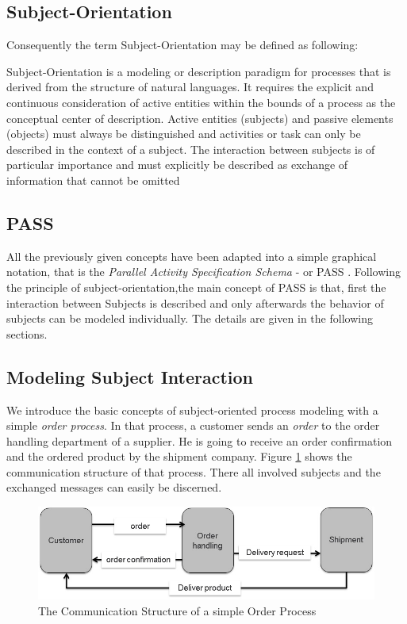 \subsection{Subject-Orientation}

Consequently the term Subject-Orientation may be defined as following: 

Subject-Orientation is a modeling or description paradigm for processes that is derived from the structure of natural languages. It requires the explicit and continuous consideration of active entities within the bounds of a process as the conceptual center of description. Active entities (subjects) and passive elements (objects) must always be distinguished and activities or task can only be described in the context of a subject. The interaction between subjects is of particular importance and must explicitly be described as exchange of information that cannot be omitted \cite{elstermann:diss}

\subsection{PASS}

All the previously given concepts have been adapted into a simple graphical notation, that is the \textit{Parallel Activity Specification Schema} - or PASS . Following the principle of subject-orientation,the main concept of PASS is that, first the interaction between Subjects is described and only afterwards the behavior of subjects can be modeled individually. The details are given in the following sections.

\subsection{Modeling Subject Interaction}

We introduce the basic concepts of subject-oriented process modeling with a simple  \textit{order process}. In that process, a customer sends an \textit{order} to the order handling department of a supplier. He is going to receive an order confirmation and the ordered product by the shipment company. Figure \ref{fig:ordercomstructure1} shows the communication structure of that process. There all involved subjects and the exchanged messages can easily be discerned. 

\begin{figure}[htbp]
	\centering
	\includegraphics[width=0.7\linewidth]{Figures/Ontology/SubjectExecution/OrderComStructure}
	\caption[The Communication Structure of a simple Order Process]{The Communication Structure of a simple Order Process}
	\label{fig:ordercomstructure1}
\end{figure}

